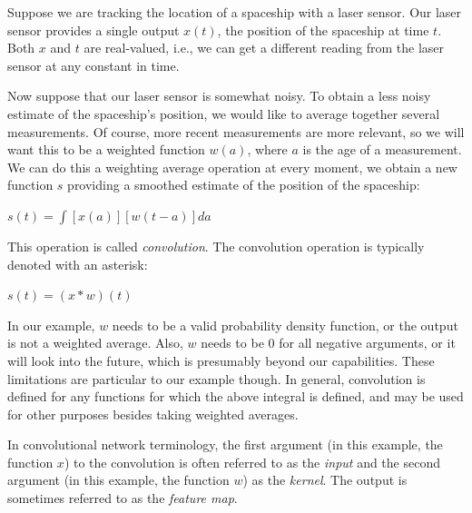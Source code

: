 \documentclass{report}
\begin{document}
\noindent Suppose we are tracking the location of a spaceship with a laser sensor. Our laser sensor provides a single output $x(t)$, the position of the spaceship at time $t$. Both $x$ and $t$ are real-valued, i.e., we can get a different reading from the laser sensor at any constant in time.\newline

\noindent Now suppose that our laser sensor is somewhat noisy. To obtain a less noisy estimate of the spaceship's position, we would like to average together several measurements. Of course, more recent measurements are more relevant, so we will want this to be a weighted function $w(a)$, where $a$ is the age of a measurement. We can do this a weighting average operation at every moment, we obtain a new function $s$ providing a smoothed estimate of the position of the spaceship:\newline\newline
    \centerline{$s(t) = \int [x(a)][w(t-a)]da$}\newline\newline
\noindent This operation is called \textit{convolution}. The convolution operation is typically denoted with an asterisk:\newline
    \centerline{$s(t) = (x * w)(t)$}\newline

In our example, $w$ needs to be a valid probability density function, or the output is not a weighted average. Also, $w$ needs to be 0 for all negative arguments, or it will look into the future, which is presumably beyond our capabilities. These limitations are particular to our example though. In general, convolution is defined for any functions for which the above integral is defined, and may be used for other purposes besides taking weighted averages.\newline

\noindent In convolutional network terminology, the first argument (in this example, the function $x$) to the convolution is often referred to as the \textit{input} and the second argument (in this example, the function $w$) as the \textit{kernel}. The output is sometimes referred to as the \textit{feature map}.\newline
\end{document}
